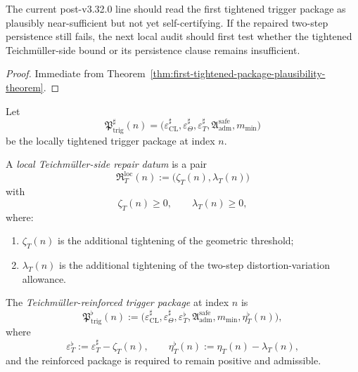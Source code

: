 \begin{corollary}
\label{cor:current-post-r22-tightened-package-reading}
The current post-v3.32.0 line should read the first tightened trigger package as plausibly near-sufficient but not yet self-certifying.
If the repaired two-step persistence still fails, the next local audit should first test whether the tightened Teichm\"uller-side bound or its persistence clause remains insufficient.
\end{corollary}

\begin{proof}
Immediate from Theorem~\ref{thm:first-tightened-package-plausibility-theorem}.
\end{proof}



\begin{definition}\label{def:local-teichmueller-side-repair-datum}
Let
\[
\mathfrak{P}_{\mathrm{trig}}^{\sharp}(n)
=
\bigl(
\varepsilon_{\mathrm{CL}}^{\sharp},
\varepsilon_{\Theta}^{\sharp},
\varepsilon_T^{\sharp},
\mathfrak{A}_{\mathrm{adm}}^{\mathrm{safe}},
 m_{\min}
\bigr)
\]
be the locally tightened trigger package at index $n$.

A \emph{local Teichm\"uller-side repair datum} is a pair
\[
\mathfrak{R}_{T}^{\mathrm{loc}}(n)
:=
\bigl(
\zeta_T(n),
\lambda_T(n)
\bigr)
\]
with
\[
\zeta_T(n)\ge 0,
\qquad
\lambda_T(n)\ge 0,
\]
where:
\begin{enumerate}
    \item $\zeta_T(n)$ is the additional tightening of the geometric threshold;
    \item $\lambda_T(n)$ is the additional tightening of the two-step distortion-variation allowance.
\end{enumerate}
\end{definition}

\begin{definition}\label{def:teichmueller-reinforced-trigger-package}
The \emph{Teichm\"uller-reinforced trigger package} at index $n$ is
\[
\mathfrak{P}_{\mathrm{trig}}^{\flat}(n)
:=
\bigl(
\varepsilon_{\mathrm{CL}}^{\sharp},
\varepsilon_{\Theta}^{\sharp},
\varepsilon_T^{\flat},
\mathfrak{A}_{\mathrm{adm}}^{\mathrm{safe}},
 m_{\min},
 \eta_T^{\flat}(n)
\bigr),
\]
where
\[
\varepsilon_T^{\flat}
:=
\varepsilon_T^{\sharp}-\zeta_T(n),
\qquad
\eta_T^{\flat}(n)
:=
\eta_T(n)-\lambda_T(n),
\]
and the reinforced package is required to remain positive and admissible.
\end{definition}

